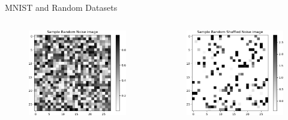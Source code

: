 \documentclass{beamer}
\begin{document}
\begin{frame}{MNIST and Random Datasets}
\begin{columns}
\begin{column}{.33\textwidth}
\begin{figure}
        \includegraphics[width=.99\textwidth]{images/mnist-behavior/MNIST-Sample-random-noise.png}
    \end{figure}
    \end{column}
    \begin{column}{.33\textwidth}
    \begin{figure}
        \centering
        \includegraphics[width=.99\textwidth]{images/mnist-behavior/MNIST-Sample-random-shuffled-noise.png}
    \end{figure}
    \end{column}
    \end{columns}
    
\end{frame}
\end{document}
